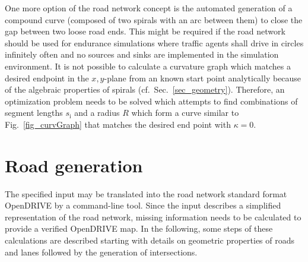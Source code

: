 \documentclass[a4paper, 10pt, conference]{ieeeconf}      %
\begin{document}
One more option of the road network concept is the automated generation of a compound curve (composed of two spirals with an arc between them) to close the gap between two loose road ends. This might be required if the road network should be used for endurance simulations where traffic agents shall drive in circles infinitely often and no sources and sinks are implemented in the simulation environment. It is not possible to calculate a curvature graph which matches a desired endpoint in the $x,y$-plane from an known start point analytically because of the algebraic properties of spirals (cf.~Sec.~\ref{sec_geometry}). Therefore, an optimization problem needs to be solved which attempts to find combinations of segment lengths $s_\text{i}$ and a radius $R$ which form a curve similar to Fig.~\ref{fig_curvGraph} that matches the desired end point with $\kappa=0$.

\section{Road generation}
The specified input may be translated into the road network standard format OpenDRIVE by a command-line tool. Since the input describes a simplified representation of the road network, missing information needs to be calculated to provide a verified OpenDRIVE map. In the following, some steps of these calculations are described starting with details on geometric properties of roads and lanes followed by the generation of intersections. 
\end{document}
